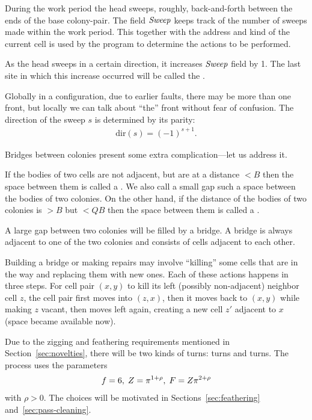 \documentclass[11pt]{memoir}
\theoremstyle{definition} %
\newcommand{\fld}[1]{\ensuremath{\textit{#1\/}}}
\def\B{B}
\newcommand{\F}{F}
\newcommand{\passno}{\pi}
\newcommand{\Q}{Q} %
\newcommand{\Z}{Z} %
\newcommand{\dir}{\mathrm{dir}} %
\newcommand{\Sweep}{\fld{Sweep}} %
\begin{document}
During the work period the head sweeps, roughly, back-and-forth between
the ends of the base colony-pair.
The field \( \Sweep \) keeps track of the number of sweeps made within the work period.
This together with the address and kind of the current cell is used by the program to determine
the actions to be performed.

\begin{definition}[Front]\label{def:front}
As the head sweeps in a certain direction, it increases \( \Sweep \) field by 1.
  The last site in which this increase occurred will be called the . 
\end{definition}

Globally in a configuration, due to earlier faults, there may be more than one front, but locally
we can talk about ``the'' front without fear of confusion.
The direction of the sweep \( s \) is determined by its parity:
\begin{align*}
  \dir(s)=(-1)^{s + 1}.
\end{align*}

 Bridges between colonies present some extra complication---let us address it.

\begin{definition}[Gaps]\label{def:gaps}
If the bodies of two cells are not adjacent, but are at a distance \( <\B \) then the space
between them is called a .
We also call a small gap such a space between the bodies of two colonies.
On the other hand, if the distance of the bodies of two colonies is \( >\B \) 
but \( <\Q\B \) then the space between them is called a .
\end{definition}

A large gap between two colonies will be filled by a bridge.
A bridge is always adjacent to one of the two colonies and consists of cells
adjacent to each other.

Building a bridge or making repairs may involve
``killing'' some cells that are in the way and replacing them with new ones.
Each of these actions happens in three steps.
For cell pair \( (x,y) \) to kill its left (possibly non-adjacent) neighbor cell \( z \),
the cell pair first moves
into \( (z,x) \), then it moves back to \( (x,y) \) while making \( z \) vacant, then moves left again,
creating a new cell \( z' \) adjacent to \( x \) (space became available now). 

 Due to the zigging and feathering requirements mentioned in Section~\ref{sec:novelties},
 there will be two kinds of turns:  turns and  turns.
 The process uses the parameters
\begin{align}\label{eq:FDef}
   \f = 6,\; \Z = \passno^{1+\rho},\; \F = \Z\passno^{2+\rho}
\end{align}
with \( \rho>0 \).
The choices will be motivated in Sections~\ref{sec:feathering} and~\ref{sec:pass-cleaning}.
\end{document}
